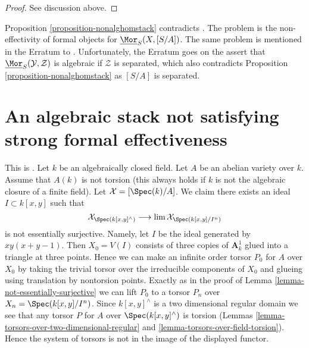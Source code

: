 \begin{proof}
See discussion above.
\end{proof}

\begin{remark}
\label{remark-contradict-aoki}
Proposition \ref{proposition-nonalghomstack} contradicts
\cite[Theorem 1.1]{AokiHomStacks}. The problem is the non-effectivity
of formal objects for $\underline{\Mor}_S(X, [S/A])$. The same problem
is mentioned in the Erratum \cite{AokiHomStacksErr} to
\cite{AokiHomStacks}. Unfortunately, the Erratum goes on
the assert that $\underline{\Mor}_S(\mathcal{Y}, \mathcal{Z})$
is algebraic if $\mathcal{Z}$ is separated, which also contradicts
Proposition \ref{proposition-nonalghomstack} as $[S/A]$ is separated.
\end{remark}








\section{An algebraic stack not satisfying strong formal effectiveness}
\label{section-non-formal-effectiveness}

\noindent
This is \cite[Example 4.12]{Bhatt-Algebraize}.
Let $k$ be an algebraically closed field.
Let $A$ be an abelian variety over $k$.
Assume that $A(k)$ is not torsion (this always holds if $k$
is not the algebraic closure of a finite field).
Let $\mathcal{X} = [\Spec(k)/A]$.
We claim there exists an ideal $I \subset k[x, y]$
such that
$$
\mathcal{X}_{\Spec(k[x, y]^\wedge)}
\longrightarrow
\lim \mathcal{X}_{\Spec(k[x, y]/I^n)}
$$
is not essentially surjective. Namely, let $I$
be the ideal generated by $xy(x + y - 1)$.
Then $X_0 = V(I)$ consists of three copies of $\mathbf{A}^1_k$
glued into a triangle at three points. Hence we can make an infinite order
torsor $P_0$ for $A$ over $X_0$ by taking the trivial torsor
over the irreducible components of $X_0$ and glueing
using translation by nontorsion points.
Exactly as in the proof of Lemma \ref{lemma-not-essentially-surjective}
we can lift $P_0$ to a torsor $P_n$ over $X_n = \Spec(k[x, y]/I^n)$.
Since $k[x, y]^\wedge$ is a two dimensional regular domain
we see that any torsor $P$ for $A$ over $\Spec(k[x, y]^\wedge)$
is torsion (Lemmas \ref{lemma-torsors-over-two-dimensional-regular}
and \ref{lemma-torsors-over-field-torsion}). Hence the system of
torsors is not in the image of the displayed functor.


